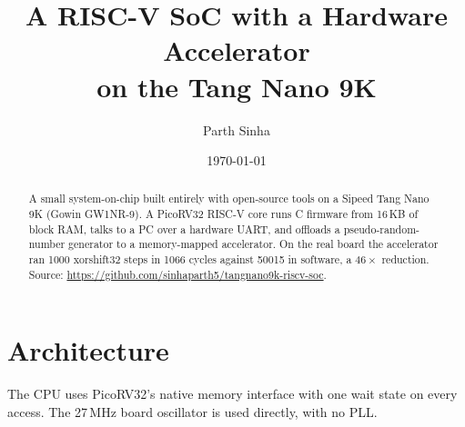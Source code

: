 \documentclass[11pt,a4paper]{article}
\title{A RISC-V SoC with a Hardware Accelerator\\on the Tang Nano 9K}
\author{Parth Sinha}
\date{\today}
\begin{document}
\maketitle

\begin{abstract}
A small system-on-chip built entirely with open-source tools on a Sipeed Tang Nano 9K (Gowin GW1NR-9).
A PicoRV32 RISC-V core runs C firmware from 16\,KB of block RAM, talks to a PC over a hardware UART,
and offloads a pseudo-random-number generator to a memory-mapped accelerator.
On the real board the accelerator ran 1000 xorshift32 steps in 1066 cycles against 50015 in software, a $46\times$ reduction.
Source: \url{https://github.com/sinhaparth5/tangnano9k-riscv-soc}.
\end{abstract}

\section{Architecture}
\begin{center}
\end{center}
The CPU uses PicoRV32's native memory interface with one wait state on every access.
The 27\,MHz board oscillator is used directly, with no PLL.
\end{document}
